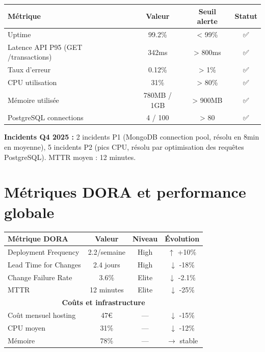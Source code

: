 \begin{tcolorbox}[colback=yellow!5!white,colframe=yellow!60!black,title=\textbf{KPIs de monitoring en production (Décembre 2025)}]
\begin{center}
\begin{tabular}{|l|c|c|c|}
\hline
\textbf{Métrique} & \textbf{Valeur} & \textbf{Seuil alerte} & \textbf{Statut} \\
\hline
Uptime & 99.2\% & < 99\% & ✅ \\
Latence API P95 (GET /transactions) & 342ms & > 800ms & ✅ \\
Taux d'erreur & 0.12\% & > 1\% & ✅ \\
CPU utilisation & 31\% & > 80\% & ✅ \\
Mémoire utilisée & 780MB / 1GB & > 900MB & ✅ \\
PostgreSQL connections & 4 / 100 & > 80 & ✅ \\
\hline
\end{tabular}
\end{center}
\textbf{Incidents Q4 2025 :} 2 incidents P1 (MongoDB connection pool, résolu en 8min en moyenne), 5 incidents P2 (pics CPU, résolu par optimisation des requêtes PostgreSQL). MTTR moyen : 12 minutes.
\end{tcolorbox}

\section{Métriques DORA et performance globale}

\begin{tcolorbox}[colback=green!5!white,colframe=green!60!black,title=\textbf{Métriques DORA -- Production Q4 2025}]
\begin{center}
\begin{tabular}{|l|c|c|c|}
\hline
\textbf{Métrique DORA} & \textbf{Valeur} & \textbf{Niveau} & \textbf{Évolution} \\
\hline
Deployment Frequency & 2.2/semaine & High & $\uparrow$ +10\% \\
Lead Time for Changes & 2.4 jours & High & $\downarrow$ -18\% \\
Change Failure Rate & 3.6\% & Elite & $\downarrow$ -2.1\% \\
MTTR & 12 minutes & Elite & $\downarrow$ -25\% \\
\hline
\multicolumn{4}{|c|}{\textbf{Coûts et infrastructure}} \\
\hline
Coût mensuel hosting & 47€ & --- & $\downarrow$ -15\% \\
CPU moyen & 31\% & --- & $\downarrow$ -12\% \\
Mémoire & 78\% & --- & $\rightarrow$ stable \\
\hline
\end{tabular}
\end{center}
\end{tcolorbox}

